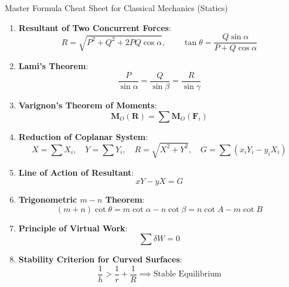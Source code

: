 \documentclass[11pt,a4paper]{article}
\begin{document}
\begin{importantbox}{Master Formula Cheat Sheet for Classical Mechanics (Statics)}
\begin{enumerate}[leftmargin=1.5em]
    \item \textbf{Resultant of Two Concurrent Forces}:
    \[ R = \sqrt{P^2 + Q^2 + 2PQ\cos\alpha}, \qquad \tan\theta = \frac{Q\sin\alpha}{P + Q\cos\alpha} \]
    \item \textbf{Lami's Theorem}:
    \[ \frac{P}{\sin\alpha} = \frac{Q}{\sin\beta} = \frac{R}{\sin\gamma} \]
    \item \textbf{Varignon's Theorem of Moments}:
    \[ \mathbf{M}_O(\mathbf{R}) = \sum \mathbf{M}_O(\mathbf{F}_i) \]
    \item \textbf{Reduction of Coplanar System}:
    \[ X = \sum X_i, \quad Y = \sum Y_i, \quad R = \sqrt{X^2 + Y^2}, \quad G = \sum (x_i Y_i - y_i X_i) \]
    \item \textbf{Line of Action of Resultant}:
    \[ xY - yX = G \]
    \item \textbf{Trigonometric $m-n$ Theorem}:
    \[ (m+n)\cot\theta = m\cot\alpha - n\cot\beta = n\cot A - m\cot B \]
    \item \textbf{Principle of Virtual Work}:
    \[ \sum \delta W = 0 \]
    \item \textbf{Stability Criterion for Curved Surfaces}:
    \[ \frac{1}{h} > \frac{1}{r} + \frac{1}{R} \implies \text{Stable Equilibrium} \]
\end{enumerate}
\end{importantbox}
\end{document}
